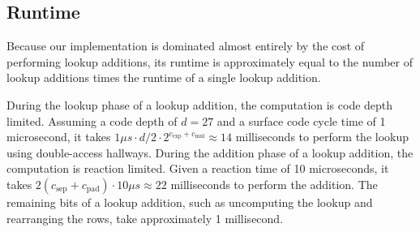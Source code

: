 \documentclass[superscriptaddress,notitlepage,longbibliography]{revtex4-1}
\theoremstyle{definition}
\theoremstyle{definition}
\newcommand{\gexp}{{c_{\text{exp}}}}
\newcommand{\gmul}{{c_{\text{mul}}}}
\newcommand{\gsep}{{c_{\text{sep}}}}
\newcommand{\gpad}{{c_{\text{pad}}}}
\begin{document}
\begin{figure}[p]
    \label{fig:addition-layout-3d}
\end{figure}


\subsection{Runtime}

Because our implementation is dominated almost entirely by the cost of performing lookup additions, its runtime is approximately equal to the number of lookup additions times the runtime of a single lookup addition.

During the lookup phase of a lookup addition, the computation is code depth limited.
Assuming a code depth of $d=27$ and a surface code cycle time of 1 microsecond, it takes $1 \mu s \cdot d/2 \cdot 2^{\gexp + \gmul} \approx 14$ milliseconds to perform the lookup using double-access hallways.
During the addition phase of a lookup addition, the computation is reaction limited.
Given a reaction time of 10 microseconds, it takes $2(\gsep + \gpad) \cdot 10 \mu s \approx 22$ milliseconds to perform the addition.
The remaining bits of a lookup addition, such as uncomputing the lookup and rearranging the rows, take approximately 1 millisecond.
\end{document}
